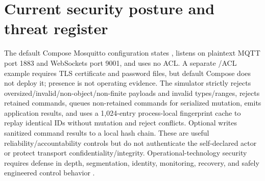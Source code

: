 \section{Current security posture and threat register}
The default Compose Mosquitto configuration states , listens on plaintext MQTT port 1883 and WebSockets port 9001, and uses no ACL. A separate /ACL example requires TLS certificate and password files, but default Compose does not deploy it; presence is not operating evidence. The simulator strictly rejects oversized/invalid/non-object/non-finite payloads and invalid types/ranges, rejects retained commands, queues non-retained commands for serialized mutation, emits application results, and uses a 1,024-entry process-local fingerprint cache to replay identical IDs without mutation and reject conflicts. Optional  writes sanitized command results to a local hash chain. These are useful reliability/accountability controls but do not authenticate the self-declared actor or protect transport confidentiality/integrity. Operational-technology security requires defense in depth, segmentation, identity, monitoring, recovery, and safely engineered control behavior \citep{nistot2023}.

